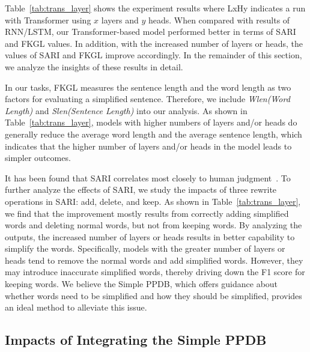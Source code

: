 \documentclass[11pt,a4paper]{article}
\begin{document}
Table~\ref{tab:trans_layer} shows the experiment results where LxHy indicates a run with Transformer using $x$ layers and $y$ heads. When compared with results of RNN/LSTM, our Transformer-based model performed better in terms of SARI and FKGL values.
In addition, with the increased number of layers or heads, the values of SARI and FKGL improve accordingly.
In the remainder of this section, we analyze the insights of these results in detail.

In our tasks, FKGL measures the sentence length and the word length as two factors for evaluating a simplified sentence. Therefore, we include \textit{Wlen(Word Length)} and \textit{Slen(Sentence Length)} into our analysis. As shown in Table~\ref{tab:trans_layer}, models with higher numbers of layers and/or heads do generally reduce the average word length and the average sentence length, which indicates that the higher number of layers and/or heads in the model leads to simpler outcomes.

It has been found that SARI correlates most closely to human judgment~\cite{xu2016optimizing}. To further analyze the effects of SARI, we study the impacts of three rewrite operations in SARI: add, delete, and keep. As shown in Table~\ref{tab:trans_layer}, we find that the improvement mostly results from correctly adding simplified words and deleting normal words, but not from keeping words. By analyzing the outputs, the increased number of layers or heads results in better capability to simplify the words. Specifically, models with the greater number of layers or heads tend to remove the normal words and add simplified words. However, they may introduce inaccurate simplified words, thereby driving down the F1 score for keeping words. We believe the Simple PPDB, which offers guidance about whether words need to be simplified and how they should be simplified, provides an ideal method to alleviate this issue.


\subsection{Impacts of Integrating the Simple PPDB}
\label{sec:result-simpleppdb}
\end{document}
